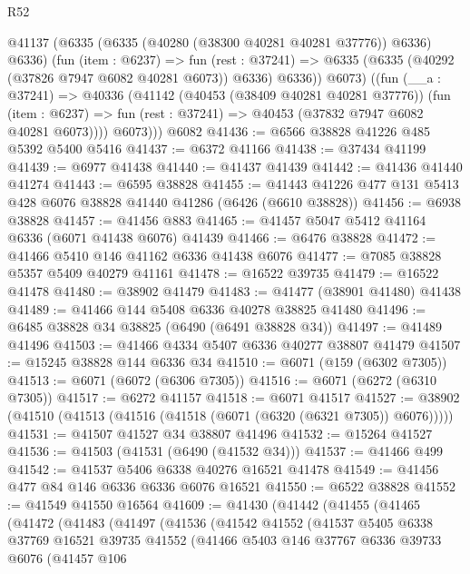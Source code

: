 \begin{lexlean}{R52}
\begin{coremodule}
        @41137
          (@6335 (@6335 (@40280 (@38300 @40281 @40281 @37776)) @6336) @6336)
          (fun (item : @6237) =>
          fun (rest : @37241) =>
          @6335 (@6335 (@40292 (@37826 @7947 @6082 @40281 @6073)) @6336) @6336))
          @6073)
        ((fun (__a : @37241) =>
        @40336
          (@41142
            (@40453 (@38409 @40281 @40281 @37776))
            (fun (item : @6237) =>
            fun (rest : @37241) => @40453 (@37832 @7947 @6082 @40281 @6073))))
          @6073)))
    @6082
@41436 := @6566 @38828 @41226 @485 @5392 @5400 @5416
@41437 := @6372 @41166
@41438 := @37434 @41199
@41439 := @6977 @41438
@41440 := @41437 @41439
@41442 := @41436 @41440 @41274
@41443 := @6595 @38828
@41455 := @41443 @41226 @477 @131 @5413 @428 @6076 @38828 @41440 @41286 (@6426 (@6610 @38828))
@41456 := @6938 @38828
@41457 := @41456 @883
@41465 := @41457 @5047 @5412 @41164 @6336 (@6071 @41438 @6076) @41439
@41466 := @6476 @38828
@41472 := @41466 @5410 @146 @41162 @6336 @41438 @6076
@41477 := @7085 @38828 @5357 @5409 @40279 @41161
@41478 := @16522 @39735
@41479 := @16522 @41478
@41480 := @38902 @41479
@41483 := @41477 (@38901 @41480) @41438
@41489 := @41466 @144 @5408 @6336 @40278 @38825 @41480
@41496 := @6485 @38828 @34 @38825 (@6490 (@6491 @38828 @34))
@41497 := @41489 @41496
@41503 := @41466 @4334 @5407 @6336 @40277 @38807 @41479
@41507 := @15245 @38828 @144 @6336 @34
@41510 := @6071 (@159 (@6302 @7305))
@41513 := @6071 (@6072 (@6306 @7305))
@41516 := @6071 (@6272 (@6310 @7305))
@41517 := @6272 @41157
@41518 := @6071 @41517
@41527 := @38902 (@41510 (@41513 (@41516 (@41518 (@6071 (@6320 (@6321 @7305)) @6076)))))
@41531 := @41507 @41527 @34 @38807 @41496
@41532 := @15264 @41527
@41536 := @41503 (@41531 (@6490 (@41532 @34)))
@41537 := @41466 @499
@41542 := @41537 @5406 @6338 @40276 @16521 @41478
@41549 := @41456 @477 @84 @146 @6336 @6336 @6076 @16521
@41550 := @6522 @38828
@41552 := @41549 @41550 @16564
@41609 := @41430
    (@41442
      (@41455
        (@41465
          (@41472
            (@41483
              (@41497
                (@41536
                  (@41542
                    @41552
                    (@41537
                      @5405
                      @6338
                      @37769
                      @16521
                      @39735
                      @41552
                      (@41466
                        @5403
                        @146
                        @37767
                        @6336
                        @39733
                        @6076
                        (@41457
                          @106

\end{coremodule}
\end{lexlean}
